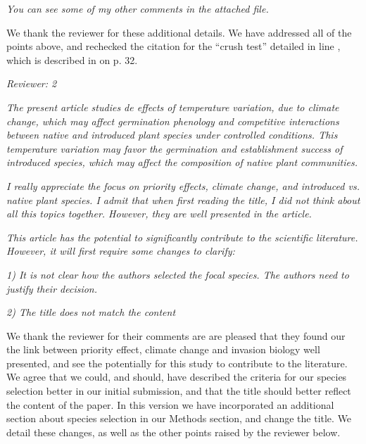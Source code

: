 \documentclass[11pt]{article}
\begin{document}


\emph{You can see some of my other comments in the attached file.}

We thank the reviewer for these additional details. We have addressed all of the points above, and rechecked the citation for the ``crush test'' detailed in line , which is described in \citet{Baskin2014} on p. 32. 

\emph{Reviewer: 2}

\emph{The present article studies de effects of temperature variation, due to climate change, which may affect germination phenology and competitive interactions between native and introduced plant species under controlled conditions. This temperature variation may favor the germination and establishment success of introduced species, which may affect the composition of native plant communities.}

\emph{I really appreciate the focus on priority effects, climate change, and introduced vs. native plant species. I admit that when first reading the title, I did not think about all this topics together. However, they are well presented in the article.}

\emph{This article has the potential to significantly contribute to the scientific literature. However, it will first require some changes to clarify:}

\emph{1) It is not clear how the authors selected the focal species. The authors need to justify their decision.}

\emph{2) The title does not match the content}

We thank the reviewer for their comments are are pleased that they found our the link between priority effect, climate change and invasion biology well presented, and see the potentially for this study to contribute to the literature. We agree that we could, and should, have described the criteria for our species selection better in our initial submission, and that the title should better reflect the content of the paper. In this version we have incorporated an additional section about species selection in our Methods section, and change the title. We detail these changes, as well as the other points raised by the reviewer below.
\end{document}
